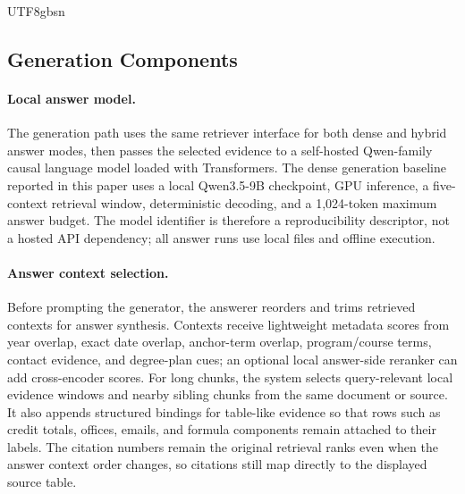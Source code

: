\documentclass{article}
\begin{document}
\begin{CJK*}{UTF8}{gbsn}
\subsection{Generation Components}

\paragraph{Local answer model.}
The generation path uses the same retriever interface for both dense and hybrid answer modes, then passes the selected evidence to a self-hosted Qwen-family causal language model loaded with Transformers. The dense generation baseline reported in this paper uses a local Qwen3.5-9B checkpoint, GPU inference, a five-context retrieval window, deterministic decoding, and a 1{,}024-token maximum answer budget. The model identifier is therefore a reproducibility descriptor, not a hosted API dependency; all answer runs use local files and offline execution.

\paragraph{Answer context selection.}
Before prompting the generator, the answerer reorders and trims retrieved contexts for answer synthesis. Contexts receive lightweight metadata scores from year overlap, exact date overlap, anchor-term overlap, program/course terms, contact evidence, and degree-plan cues; an optional local answer-side reranker can add cross-encoder scores. For long chunks, the system selects query-relevant local evidence windows and nearby sibling chunks from the same document or source. It also appends structured bindings for table-like evidence so that rows such as credit totals, offices, emails, and formula components remain attached to their labels. The citation numbers remain the original retrieval ranks even when the answer context order changes, so citations still map directly to the displayed source table.


\end{CJK*}
\end{document}
